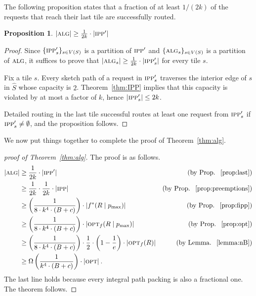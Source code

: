 \documentclass[11pt]{article}
\newtheorem{proposition}[theorem]{Proposition}
\newcommand{\route}{\text{\sc{ipp}}}
\newcommand{\IPP}{\route}
\newcommand{\opt}{\text{\textsc{opt}}}
\newcommand{\pmax}{p_{\max}}
\newcommand{\alg}{\text{\sc{alg}}}
\newenvironment{proof sketch}[1]{\noindent {\emph{Proof sketch of #1:}}}{\hfill \qed}
\begin{document}
The following proposition states that a fraction of at least $1/(2k)$ of the requests
that reach their last tile are successfully routed.
\begin{proposition}\label{prop:last}\label{prop:Rs}
    $|\alg| \geq \frac{1}{2k} \cdot |\IPP'|$
\end{proposition}

\begin{proof}
  Since $\{\IPP'_s\}_{s \in V(S)}$ is a partition of $\IPP'$ and  $\{\alg_s\}_{s \in V(S)}$ is a partition of $\alg$, it suffices to prove
  that $|\alg_s| \geq \frac{1}{2k}\cdot |\IPP'_s|$ for every tile $s$.

  Fix a tile $s$.  Every sketch path of a request in $\IPP'_s$ traverses the interior
  edge of $s$ in $\hat S$ whose capacity is $2$. Theorem~\ref{thm:IPP} implies that
  this capacity is violated by at most a factor of $k$, hence $|\IPP'_s| \leq 2k$.

  Detailed routing in the last tile successful routes at least one request from
  $\IPP'_s$ if $\IPP'_s \neq \emptyset$, and the proposition follows.
\end{proof}

\noindent
We now put things together to complete the proof of Theorem~\ref{thm:alg}.
\begin{proof}[proof of Theorem~\ref{thm:alg}]
The proof is as follows.
  \begin{align*}
    |\alg|  &\geq  \frac{1}{2k} \cdot |\IPP'|&\text{(by Prop. ~\ref{prop:last})}\\
     &\geq  \frac{1}{2k} \cdot \frac{1}{2k} \cdot |\IPP|&\text{(by Prop. ~\ref{prop:preemptions})}\\
    &\geq \left(\frac{1}{8\cdot k^{4}\cdot (B+c)}\right) \cdot  |f^*(R\mid \pmax)|&\text{(by Prop. ~\ref{prop:fipp})}\\
    &\geq \left(\frac{1}{8\cdot k^{4}\cdot (B+c)}\right) \cdot  |\opt_f(R\mid \pmax)| &\text{(by Prop. ~\ref{prop:opt})}\\
    &\geq \left(\frac{1}{8\cdot k^{4}\cdot (B+c)}\right)  \cdot \frac 12 \cdot \left(1-\frac 1e \right) \cdot |\opt_f(R)|&\text{(by Lemma. ~\ref{lemma:nB})}\\
    &\geq  \Omega\left(\frac{1}{k^{4}\cdot(B+c)}\right) \cdot
    |\opt|\:.
  \end{align*}
The last line holds because every integral path packing is also a fractional one.
The theorem follows.
\end{proof}
\end{document}
